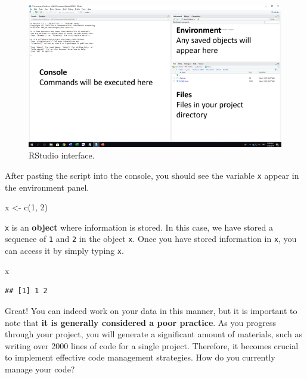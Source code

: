 \documentclass[
]{book}
\newenvironment{Shaded}{\begin{snugshade}}{\end{snugshade}}
\newcommand{\DecValTok}[1]{\textcolor[rgb]{0.00,0.00,0.81}{#1}}
\newcommand{\FunctionTok}[1]{\textcolor[rgb]{0.00,0.00,0.00}{#1}}
\newcommand{\NormalTok}[1]{#1}
\newcommand{\OtherTok}[1]{\textcolor[rgb]{0.56,0.35,0.01}{#1}}
\begin{document}
\begin{figure}

{\centering \includegraphics[width=9.47in]{image/r_image01} 

}

\caption{RStudio interface.}\label{fig:ui}
\end{figure}

After pasting the script into the console, you should see the variable \texttt{x} appear in the environment panel.

\begin{Shaded}
\begin{Highlighting}[]
\NormalTok{x }\OtherTok{\textless{}{-}} \FunctionTok{c}\NormalTok{(}\DecValTok{1}\NormalTok{, }\DecValTok{2}\NormalTok{)}
\end{Highlighting}
\end{Shaded}

\texttt{x} is an \textbf{object} where information is stored. In this case, we have stored a sequence of \texttt{1} and \texttt{2} in the object \texttt{x}. Once you have stored information in \texttt{x}, you can access it by simply typing \texttt{x}.

\begin{Shaded}
\begin{Highlighting}[]
\NormalTok{x}
\end{Highlighting}
\end{Shaded}

\begin{verbatim}
## [1] 1 2
\end{verbatim}

Great! You can indeed work on your data in this manner, but it is important to note that \textbf{it is generally considered a poor practice}. As you progress through your project, you will generate a significant amount of materials, such as writing over 2000 lines of code for a single project. Therefore, it becomes crucial to implement effective code management strategies. How do you currently manage your code?
\end{document}

